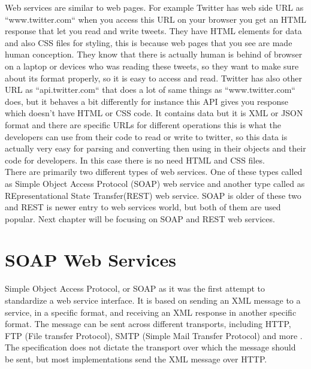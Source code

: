 Web services are similar to web pages. For example Twitter has web side URL as “www.twitter.com“ when you access this URL on
your browser you get an HTML response that let you read and write tweets. They have HTML elements for data and also CSS files
for styling, this is because web pages that you see are made human conception. They know that there is actually human is behind
of browser on a laptop or devices who was reading these tweets, so they want to make sure about its format properly, so it is easy to access and read.
Twitter has also other URL as “api.twitter.com“ that does a lot of same things as “www.twitter.com“ does, but it behaves a bit
differently for instance this API gives you response which doesn’t have HTML or CSS code. It contains data but it is XML or JSON format and there are specific URLs for different operations this is what the developers can use from their code to read or write to twitter, so this data is actually very easy for parsing and converting then using in their objects and their code for developers. In this case there is no need HTML and CSS files.\\
There are primarily two different types of web services. One of these types called as  Simple Object Access Protocol (SOAP) web
service and another type called as REpresentational State Transfer(REST) web service. SOAP is older of these two and REST is newer entry to web services world, but both of them are used popular.
Next chapter will be focusing on SOAP and REST web services.

\section{SOAP Web Services}
\label{section:soa}

Simple Object Access Protocol, or SOAP as it was the first attempt to standardize a web service interface. It is based on
sending an XML message to a service, in a specific format, and receiving an XML response in another specific format.
The message can be sent across different transports, including HTTP, FTP (File transfer Protocol), SMTP (Simple Mail Transfer Protocol) and more \citep{thesis:state1}. The specification does not
dictate the transport over which the message should be sent, but most implementations send the XML message over HTTP.\\

